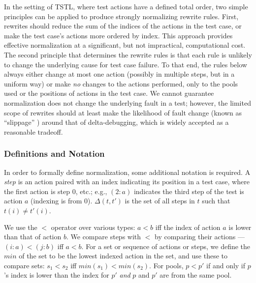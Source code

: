 
In the setting of TSTL, where test actions have a defined total
order, two simple principles can be applied to produce strongly
normalizing rewrite rules.  First, rewrites should reduce the sum of the
indices of the actions in the test case, or make the test case's
actions more ordered by index.  This approach
provides effective normalization at a significant, but not
impractical, computational cost.
The second principle that determines the rewrite rules is that each
rule is unlikely to change the underlying cause for test case
failure.  To that end, the rules below always either change at most
one action (possibly in multiple steps, but in a uniform way) or make
\emph{no} changes to the actions performed, only to the pools used or the
positions of actions in the test case.  We cannot guarantee
normalization does not change the underlying fault in a test; however,
the limited scope of rewrites should at least make the likelihood of
fault change (known as ``slippage'' \cite{PLDI13}) around that of
delta-debugging, which is widely accepted as a reasonable tradeoff.

\subsubsection{Definitions and Notation}

In order to formally define normalization, some additional notation is required.
A \emph{step} is an action paired with an index indicating its
position in a test case,
where the first action is step 0, etc.; e.g., $(2: a)$ indicates the
third step of the test is action $a$ (indexing is from 0). 
$\Delta(t,t')$ is the set of all steps in $t$ such that $t(i) \not= t'(i)$.

We use the $<$ operator over various types:
$a < b$ iff the index of action $a$ is lower
than that of action $b$.  We compare steps with $<$ by comparing their
actions --- $(i: a) < (j: b)$ iff $a < b$.  For a set or sequence of actions or steps, we define the $min$ of the
set to be the lowest indexed action in the set, and use
these to compare sets:  $s_1 < s_2$ iff $min(s_1) < min(s_2)$. For pools,
$p < p'$ if and only if $p$'s index is lower than the index for $p'$
\emph{and} $p$ and $p'$ are from the same pool.

